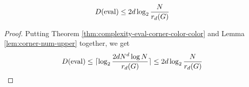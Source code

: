 \begin{corollary}
  \label{cor:complexity-eval-corner-free-num}

  $$D(\operatorname{eval}) \le 2d\log_2\frac N{r_d(G)}$$ %
\end{corollary}
\begin{proof}

  Putting Theorem \ref{thm:complexity-eval-corner-color-color} and Lemma \ref{lem:corner-num-upper} together, we get
  $$D(\operatorname{eval}) \le \lceil\log_2\frac{2dN^d\log N}{r_d(G)}\rceil \le 2d\log_2\frac N{r_d(G)}$$
\end{proof}
